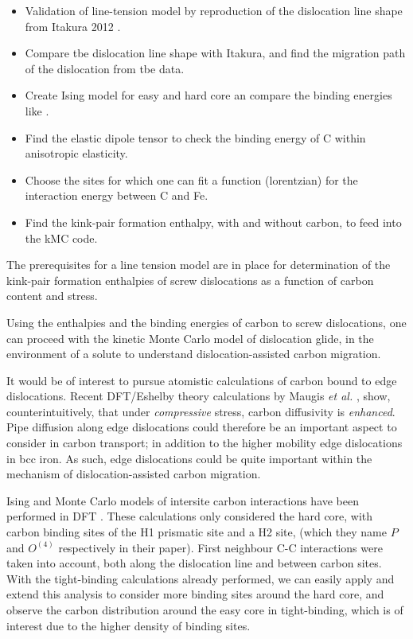 \documentclass[a4paper,11pt]{article}
\begin{document}
\begin{itemize}
\item Validation of line-tension model by reproduction of the dislocation line shape from
Itakura 2012 \cite{Itakura2012}.
\item Compare tbe dislocation line shape with Itakura, and find the migration path of the dislocation from tbe data.
\item\relax [Optional] Create Ising model for easy and hard core an compare the binding energies like \cite{Lthi2019}.
\item\relax [Optional] Find the elastic dipole tensor to check the binding energy of C within anisotropic elasticity.
\item Choose the sites for which one can fit a function (lorentzian) for the interaction energy between C and Fe.
\item Find the kink-pair formation enthalpy, with and without carbon, to feed into the kMC
code.
\end{itemize}

The prerequisites for a line tension model are in place for determination of the
kink-pair formation enthalpies of screw dislocations as a function of carbon
content and stress. 

Using the enthalpies and the binding energies of carbon to screw dislocations,
one can proceed with the kinetic Monte Carlo model of dislocation glide, in
the environment of a solute to understand dislocation-assisted carbon migration.


It would be of interest to pursue atomistic calculations of carbon bound to edge
dislocations. Recent DFT/Eshelby theory calculations by Maugis \emph{et al.} \cite{Maugis2020}, show,
counterintuitively, that under \emph{compressive} stress, carbon diffusivity is \emph{enhanced}. Pipe
diffusion along edge dislocations could therefore be an important aspect to consider in carbon transport; in
addition to the higher mobility edge dislocations in bcc iron. As such, edge dislocations could be quite
important within the mechanism of dislocation-assisted carbon migration. 

Ising and Monte Carlo models of intersite carbon interactions have been
performed in DFT \cite{Lthi2019}.  These calculations only considered the hard
core, with carbon binding sites of the H1 prismatic site and a H2 site, (which
they name \(P\) and \(O^{(4)}\) respectively in their paper). First neighbour C-C
interactions were taken into account, both along the dislocation line and
between carbon sites. With the tight-binding calculations already performed,
we can easily apply and extend this analysis to consider more
binding sites around the hard core, and observe the carbon
distribution around the easy core in tight-binding, which is of interest due to
the higher density of binding sites.
\end{document}
